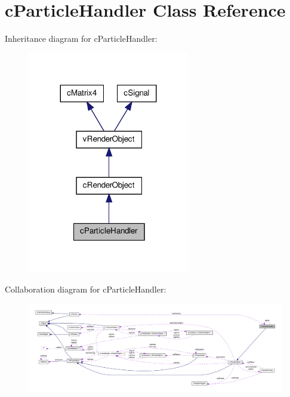 \hypertarget{classc_particle_handler}{
\section{cParticleHandler Class Reference}
\label{classc_particle_handler}
}


Inheritance diagram for cParticleHandler:
\nopagebreak
\begin{figure}[H]
\begin{center}
\leavevmode
\includegraphics[width=200pt]{classc_particle_handler__inherit__graph}
\end{center}
\end{figure}


Collaboration diagram for cParticleHandler:
\nopagebreak
\begin{figure}[H]
\begin{center}
\leavevmode
\includegraphics[width=400pt]{classc_particle_handler__coll__graph}
\end{center}
\end{figure}
